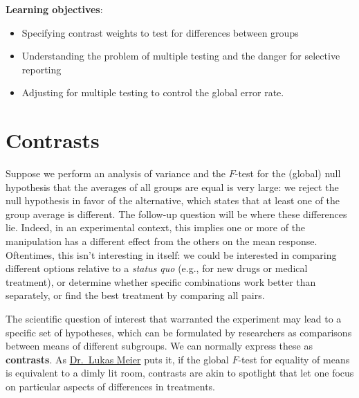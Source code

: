 \documentclass[
  11pt,
  letterpaper,
]{scrbook}
\providecommand{\tightlist}{%
  \setlength{\itemsep}{0pt}\setlength{\parskip}{0pt}}\usepackage{longtable,booktabs,array}
\theoremstyle{definition}
\theoremstyle{definition}
\theoremstyle{remark}
\begin{document}
\begin{tcolorbox}[enhanced jigsaw, left=2mm, leftrule=.75mm, coltitle=black, breakable, bottomrule=.15mm, colframe=quarto-callout-important-color-frame, titlerule=0mm, colbacktitle=quarto-callout-important-color!10!white, rightrule=.15mm, toprule=.15mm, title=\textcolor{quarto-callout-important-color}{\faExclamation}\hspace{0.5em}{Key concept}, opacityback=0, toptitle=1mm, bottomtitle=1mm, arc=.35mm, opacitybacktitle=0.6, colback=white]

\textbf{Learning objectives}:

\begin{itemize}
\tightlist
\item
  Specifying contrast weights to test for differences between groups
\item
  Understanding the problem of multiple testing and the danger for
  selective reporting
\item
  Adjusting for multiple testing to control the global error rate.
\end{itemize}

\end{tcolorbox}

\section{Contrasts}\label{contrasts}

Suppose we perform an analysis of variance and the \(F\)-test for the
(global) null hypothesis that the averages of all groups are equal is
very large: we reject the null hypothesis in favor of the alternative,
which states that at least one of the group average is different. The
follow-up question will be where these differences lie. Indeed, in an
experimental context, this implies one or more of the manipulation has a
different effect from the others on the mean response. Oftentimes, this
isn't interesting in itself: we could be interested in comparing
different options relative to a \emph{status quo} (e.g., for new drugs
or medical treatment), or determine whether specific combinations work
better than separately, or find the best treatment by comparing all
pairs.

The scientific question of interest that warranted the experiment may
lead to a specific set of hypotheses, which can be formulated by
researchers as comparisons between means of different subgroups. We can
normally express these as \textbf{contrasts}. As
\href{https://stat.ethz.ch/~meier}{Dr.~Lukas Meier} puts it, if the
global \(F\)-test for equality of means is equivalent to a dimly lit
room, contrasts are akin to spotlight that let one focus on particular
aspects of differences in treatments.
\end{document}
